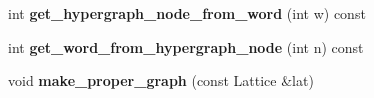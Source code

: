 \begin{DoxyCompactItemize}
\item 
\hypertarget{classForestLattice_a01fa72075f1de8421dd21e15540ce5c0}{
int {\bfseries get\_\-hypergraph\_\-node\_\-from\_\-word} (int w) const }
\label{classForestLattice_a01fa72075f1de8421dd21e15540ce5c0}

\item 
\hypertarget{classForestLattice_a226887bedd13a3f3dc5cbe91242bd17a}{
int {\bfseries get\_\-word\_\-from\_\-hypergraph\_\-node} (int n) const }
\label{classForestLattice_a226887bedd13a3f3dc5cbe91242bd17a}

\item 
\hypertarget{classForestLattice_a8f474062475f4d272a8d8b676cdd0118}{
void {\bfseries make\_\-proper\_\-graph} (const Lattice \&lat)}
\label{classForestLattice_a8f474062475f4d272a8d8b676cdd0118}

\end{DoxyCompactItemize}
